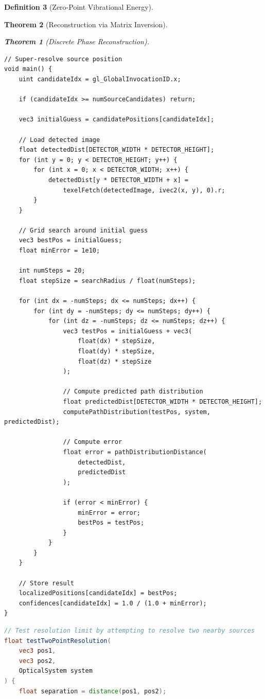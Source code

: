 \documentclass[11pt,a4paper]{article}
\newtheorem{theorem}{Theorem}[section]
\theoremstyle{definition}
\newtheorem{definition}[theorem]{Definition}
\theoremstyle{remark}
\begin{document}
\begin{definition}[Zero-Point Vibrational Energy]
\begin{theorem}[Reconstruction via Matrix Inversion]
\begin{theorem}[Discrete Phase Reconstruction]
\begin{lstlisting}
// Super-resolve source position
void main() {
    uint candidateIdx = gl_GlobalInvocationID.x;
    
    if (candidateIdx >= numSourceCandidates) return;
    
    vec3 initialGuess = candidatePositions[candidateIdx];
    
    // Load detected image
    float detectedDist[DETECTOR_WIDTH * DETECTOR_HEIGHT];
    for (int y = 0; y < DETECTOR_HEIGHT; y++) {
        for (int x = 0; x < DETECTOR_WIDTH; x++) {
            detectedDist[y * DETECTOR_WIDTH + x] = 
                texelFetch(detectedImage, ivec2(x, y), 0).r;
        }
    }
    
    // Grid search around initial guess
    vec3 bestPos = initialGuess;
    float minError = 1e10;
    
    int numSteps = 20;
    float stepSize = searchRadius / float(numSteps);
    
    for (int dx = -numSteps; dx <= numSteps; dx++) {
        for (int dy = -numSteps; dy <= numSteps; dy++) {
            for (int dz = -numSteps; dz <= numSteps; dz++) {
                vec3 testPos = initialGuess + vec3(
                    float(dx) * stepSize,
                    float(dy) * stepSize,
                    float(dz) * stepSize
                );
                
                // Compute predicted path distribution
                float predictedDist[DETECTOR_WIDTH * DETECTOR_HEIGHT];
                computePathDistribution(testPos, system, predictedDist);
                
                // Compute error
                float error = pathDistributionDistance(
                    detectedDist,
                    predictedDist
                );
                
                if (error < minError) {
                    minError = error;
                    bestPos = testPos;
                }
            }
        }
    }
    
    // Store result
    localizedPositions[candidateIdx] = bestPos;
    confidences[candidateIdx] = 1.0 / (1.0 + minError);
}
\end{lstlisting}

\begin{lstlisting}[language=GLSL,caption={Two-Point Resolution Test}]
// Test resolution limit by attempting to resolve two nearby sources
float testTwoPointResolution(
    vec3 pos1,
    vec3 pos2,
    OpticalSystem system
) {
    float separation = distance(pos1, pos2);
    

\end{lstlisting}
\end{theorem}
\end{theorem}
\end{definition}
\end{document}
